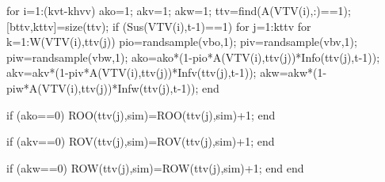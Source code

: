                                     for i=1:(kvt-khvv)
                                          ako=1;
                                          akv=1;
                                          akw=1;
                                          ttv=find(A(VTV(i),:)==1);    
                                          [bttv,kttv]=size(ttv);
                                          if (Sus(VTV(i),t-1)==1)
                                                    for j=1:kttv                                                                                                  
                                                          for k=1:W(VTV(i),ttv(j))                       
                                                                pio=randsample(vbo,1);
                                                                piv=randsample(vbv,1);
                                                                piw=randsample(vbw,1);
                                                                ako=ako*(1-pio*A(VTV(i),ttv(j))*Info(ttv(j),t-1));
                                                                akv=akv*(1-piv*A(VTV(i),ttv(j))*Infv(ttv(j),t-1));
                                                                akw=akw*(1-piw*A(VTV(i),ttv(j))*Infw(ttv(j),t-1));                                                                 
                                                          end
                                                          
                                                          if (ako==0)
                                                             ROO(ttv(j),sim)=ROO(ttv(j),sim)+1;
                                                          end
                                                          
                                                          if (akv==0)
                                                             ROV(ttv(j),sim)=ROV(ttv(j),sim)+1;
                                                          end
                                                          
                                                          if (akw==0)
                                                             ROW(ttv(j),sim)=ROW(ttv(j),sim)+1;
                                                          end
                                                    end
                                                     
